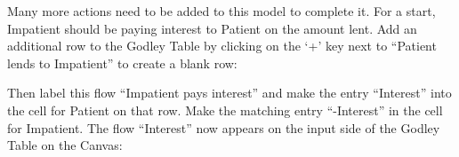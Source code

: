 Many more actions need to be added to this model to complete it. For
a start, Impatient should be paying interest to Patient on the amount
lent. Add an additional row to the Godley Table by clicking on the
`+' key next to ``Patient lends to Impatient'' to create a blank
row:


\begin{center}
\par\end{center}

Then label this flow ``Impatient pays interest'' and make the entry
``Interest'' into the cell for Patient on that row. Make the matching
entry ``-Interest'' in the cell for Impatient. The flow ``Interest''
now appears on the input side of the Godley Table on the Canvas:


